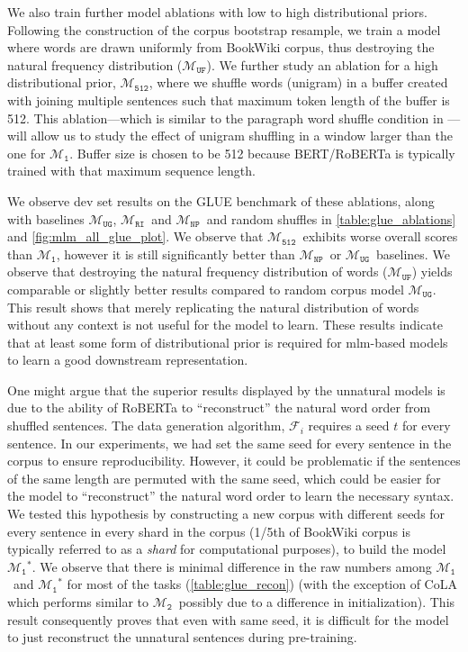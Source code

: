 \documentclass[letterpaper, 12pt]{report}
\newcommand{\RI}{$\mathcal{M}_{\texttt{1}}$}
\newcommand{\RII}{$\mathcal{M}_{\texttt{2}}$}
\newcommand{\RC}{$\mathcal{M}_{\texttt{UG}}$}
\newcommand{\RU}{$\mathcal{M}_{\texttt{UF}}$}
\newcommand{\RT}{$\mathcal{M}_{\texttt{RI}}$}
\newcommand{\NP}{$\mathcal{M}_{\texttt{NP}}$}
\newcommand{\RV}{$\mathcal{M}_{\texttt{512}}$}
\begin{document}
We also train further model ablations with low to high distributional priors. Following the construction of the corpus bootstrap resample, we train a model where words are drawn uniformly from BookWiki corpus, thus destroying the natural frequency distribution (\RU). We further study an ablation for a high distributional prior, \RV, where we shuffle words (unigram) in a buffer created with joining multiple sentences such that maximum token length of the buffer is 512. This ablation---which is similar to the paragraph word shuffle condition in \cite{gauthier-levy-2019-linking}---will allow us to study the effect of unigram shuffling in a window larger than the one for \RI. Buffer size is chosen to be 512 because BERT/RoBERTa is typically trained with that maximum sequence length.

We observe dev set results on the GLUE benchmark of these ablations, along with baselines \RC, \RT\ and \NP\ and random shuffles in \autoref{table:glue_ablations} and \autoref{fig:mlm_all_glue_plot}. We observe that \RV\ exhibits worse overall scores than \RI, however it is still significantly better than \NP\ or \RC\ baselines. We observe that destroying the natural frequency distribution of words (\RU) yields comparable or slightly better results compared to random corpus model \RC. This result shows that merely replicating the natural distribution of words without any context is not useful for the model to learn. These results indicate that at least some form of distributional prior is required for \acrshort{mlm}-based models to learn a good downstream representation.



One might argue that the superior results displayed by the unnatural models is due to the ability of RoBERTa to ``reconstruct'' the natural word order from shuffled sentences. The data generation algorithm, $\mathcal{F}_{i}$ requires a seed $t$ for every sentence. In our experiments, we had set the same seed for every sentence in the corpus to ensure reproducibility. However, it could be problematic if the sentences of the same length are permuted with the same seed, which could be easier for the model to ``reconstruct'' the natural word order to learn the necessary syntax. We tested this hypothesis by constructing a new corpus with different seeds for every sentence in every shard in the corpus (1/5th of BookWiki corpus is typically referred to as a \textit{shard} for computational purposes), to build the model \RI$^{*}$. We observe that there is minimal difference in the raw numbers among \RI\ and \RI$^{*}$ for most of the tasks (\autoref{table:glue_recon}) (with the exception of CoLA which performs similar to \RII\, possibly due to a difference in initialization). This result consequently proves that even with same seed, it is difficult for the model to just reconstruct the unnatural sentences during pre-training.
\end{document}
